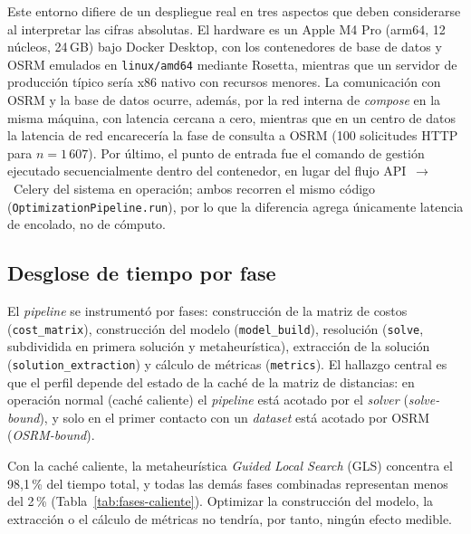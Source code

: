 Este entorno difiere de un despliegue real en tres aspectos que deben
considerarse al interpretar las cifras absolutas. El hardware es un Apple
M4 Pro (arm64, 12 núcleos, 24\,GB) bajo Docker Desktop, con los contenedores de
base de datos y OSRM emulados en \texttt{linux/amd64} mediante Rosetta,
mientras que un servidor de producción típico sería x86 nativo con recursos
menores. La comunicación con OSRM y la base de datos ocurre, además, por la red
interna de \textit{compose} en la misma máquina, con latencia cercana a cero,
mientras que en un centro de datos la latencia de red encarecería la fase de
consulta a OSRM (100 solicitudes HTTP para $n=1\,607$). Por último, el punto de
entrada fue el comando de gestión ejecutado secuencialmente dentro del
contenedor, en lugar del flujo API~$\rightarrow$~Celery del sistema en
operación; ambos recorren el mismo código
(\texttt{OptimizationPipeline.run}), por lo que la diferencia agrega
únicamente latencia de encolado, no de cómputo.

\subsection{Desglose de tiempo por fase}

El \textit{pipeline} se instrumentó por fases: construcción de la matriz de
costos (\texttt{cost\_matrix}), construcción del modelo
(\texttt{model\_build}), resolución (\texttt{solve}, subdividida en primera
solución y metaheurística), extracción de la solución
(\texttt{solution\_extraction}) y cálculo de métricas (\texttt{metrics}). El
hallazgo central es que el perfil depende del estado de la caché de la matriz
de distancias: en operación normal (caché caliente) el \textit{pipeline} está
acotado por el \textit{solver} (\textit{solve-bound}), y solo en el primer contacto con
un \textit{dataset} está acotado por OSRM (\textit{OSRM-bound}).

Con la caché caliente, la metaheurística \textit{Guided Local Search} (GLS)
concentra el 98,1\,\% del tiempo total, y todas las demás fases combinadas
representan menos del 2\,\% (Tabla~\ref{tab:fases-caliente}). Optimizar la
construcción del modelo, la extracción o el cálculo de métricas no tendría,
por tanto, ningún efecto medible.

